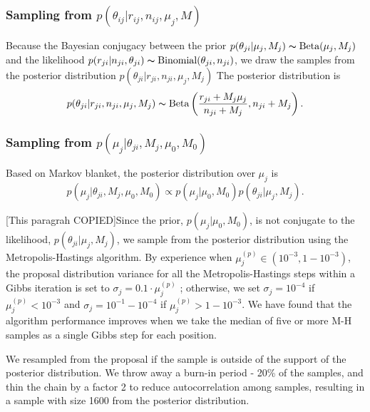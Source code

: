 \documentclass[11pt,reqno]{amsart}
\begin{document}
\subsubsection{Sampling from $p \left( \theta_{ij} |r_{ij},n_{ij},\mu_j,M \right)$}

Because the Bayesian conjugacy between the prior
$p(\theta_{ji} | \mu_j, M_j) \thicksim \text{Beta}(\mu_j, M_j)$
and the likelihood
$p(r_{ji} | n_{ji}, \theta_{ji}) \thicksim \text{Binomial}(\theta_{ji}, n_{ji})$,
we draw the samples from the posterior distribution
$p(\theta_{ji} | r_{ji}, n_{ji}, \mu_j, M_j)$
The posterior distribution is
\begin{equation}
	p(\theta_{ji} | r_{ji}, n_{ji}, \mu_j, M_j) \thicksim \text{Beta}\left( \frac{r_{ji} + M_j \mu_j}{n_{ji} + M_j} , n_{ji} + M_j\right).
\end{equation}

\subsubsection{Sampling from $p \left( \mu_j |\theta_{ji},M_j,\mu_0,M_0\right)$}
Based on Markov blanket, the posterior distribution over $\mu_j$ is
\begin{equation}
	p( \mu_j | \theta_{ji}, M_j, \mu_0, M_0 ) \propto p(\mu_j | \mu_0, M_0) p(\theta_{ji} | \mu_j, M_j).
\end{equation}

[This paragrah COPIED]Since the prior, $p(\mu_j | \mu_0, M_0)$, is not conjugate to the likelihood, $p(\theta_{ji} | \mu_j, M_j)$, we sample from the posterior distribution using the Metropolis-Hastings algorithm.
By experience when $\mu_j^{(p)} \in (10^{-3},1-10^{-3})$, the proposal distribution variance for all the Metropolis-Hastings steps within a Gibbs iteration is set to $\sigma_j = 0.1 \cdot \mu_j^{(p)}$ ;
otherwise, we set $\sigma_j = 10^{-4}$ if $\mu_j^{(p)}< 10^{-3}$ and $\sigma_j = 10^{-1}-10^{-4}$ if $\mu_j^{(p)}>1-10^{-3}$.
We have found that the algorithm performance improves when we take the median of five or more M-H samples as a single Gibbs step for each position.

We resampled from the proposal if the sample is outside of the support of the posterior distribution.
We throw away a burn-in period - 20\% of the samples, and thin the chain by a factor 2 to reduce autocorrelation among samples, resulting in a sample with size 1600 from the posterior distribution.
\end{document}
